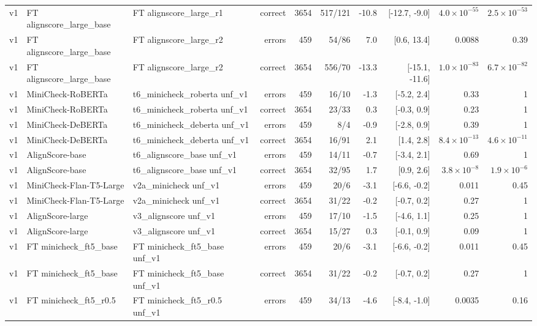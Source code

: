 \begin{scriptsize}
\begin{longtable}{lllrrrrrrr}
v1 & FT alignscore\_large\_base & FT alignscore\_large\_r1 & correct & 3654 & 517/121 & -10.8 & [-12.7, -9.0] & $4.0\times10^{-55}$ & $2.5\times10^{-53}$ \\
v1 & FT alignscore\_large\_base & FT alignscore\_large\_r2 & errors & 459 & 54/86 & 7.0 & [0.6, 13.4] & 0.0088 & 0.39 \\
v1 & FT alignscore\_large\_base & FT alignscore\_large\_r2 & correct & 3654 & 556/70 & -13.3 & [-15.1, -11.6] & $1.0\times10^{-83}$ & $6.7\times10^{-82}$ \\
v1 & MiniCheck-RoBERTa & t6\_minicheck\_roberta unf\_v1 & errors & 459 & 16/10 & -1.3 & [-5.2, 2.4] & 0.33 & 1 \\
v1 & MiniCheck-RoBERTa & t6\_minicheck\_roberta unf\_v1 & correct & 3654 & 23/33 & 0.3 & [-0.3, 0.9] & 0.23 & 1 \\
v1 & MiniCheck-DeBERTa & t6\_minicheck\_deberta unf\_v1 & errors & 459 & 8/4 & -0.9 & [-2.8, 0.9] & 0.39 & 1 \\
v1 & MiniCheck-DeBERTa & t6\_minicheck\_deberta unf\_v1 & correct & 3654 & 16/91 & 2.1 & [1.4, 2.8] & $8.4\times10^{-13}$ & $4.6\times10^{-11}$ \\
v1 & AlignScore-base & t6\_alignscore\_base unf\_v1 & errors & 459 & 14/11 & -0.7 & [-3.4, 2.1] & 0.69 & 1 \\
v1 & AlignScore-base & t6\_alignscore\_base unf\_v1 & correct & 3654 & 32/95 & 1.7 & [0.9, 2.6] & $3.8\times10^{-8}$ & $1.9\times10^{-6}$ \\
v1 & MiniCheck-Flan-T5-Large & v2a\_minicheck unf\_v1 & errors & 459 & 20/6 & -3.1 & [-6.6, -0.2] & 0.011 & 0.45 \\
v1 & MiniCheck-Flan-T5-Large & v2a\_minicheck unf\_v1 & correct & 3654 & 31/22 & -0.2 & [-0.7, 0.2] & 0.27 & 1 \\
v1 & AlignScore-large & v3\_alignscore unf\_v1 & errors & 459 & 17/10 & -1.5 & [-4.6, 1.1] & 0.25 & 1 \\
v1 & AlignScore-large & v3\_alignscore unf\_v1 & correct & 3654 & 15/27 & 0.3 & [-0.1, 0.9] & 0.09 & 1 \\
v1 & FT minicheck\_ft5\_base & FT minicheck\_ft5\_base unf\_v1 & errors & 459 & 20/6 & -3.1 & [-6.6, -0.2] & 0.011 & 0.45 \\
v1 & FT minicheck\_ft5\_base & FT minicheck\_ft5\_base unf\_v1 & correct & 3654 & 31/22 & -0.2 & [-0.7, 0.2] & 0.27 & 1 \\
v1 & FT minicheck\_ft5\_r0.5 & FT minicheck\_ft5\_r0.5 unf\_v1 & errors & 459 & 34/13 & -4.6 & [-8.4, -1.0] & 0.0035 & 0.16 \\

\end{longtable}
\end{scriptsize}
